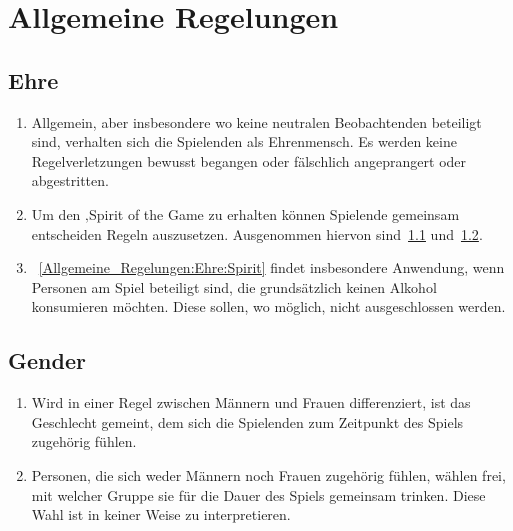 \chapter{Allgemeine Regelungen}\label{Allgemeine_Regelungen}

\section{Ehre}\label{Allgemeine_Regelungen:Ehre}
\begin{enumerate}[label={(\arabic*)}]
	\item Allgemein, aber insbesondere wo keine neutralen Beobachtenden beteiligt sind, verhalten sich die Spielenden als Ehrenmensch.
	Es werden keine Regelverletzungen bewusst begangen oder fälschlich angeprangert oder abgestritten.
	
	\item\label{Allgemeine_Regelungen:Ehre:Spirit}
	Um den \glqq{}‚Spirit of the Game\grqq{} zu erhalten können Spielende gemeinsam entscheiden Regeln auszusetzen.
	Ausgenommen hiervon sind~\ref{Allgemeine_Regelungen:Ehre} und~\ref{Allgemeine_Regelungen:Gender}.
	
	\item
~\ref{Allgemeine_Regelungen:Ehre:Spirit} findet insbesondere Anwendung, wenn Personen am Spiel beteiligt sind, die grundsätzlich keinen Alkohol konsumieren möchten.
	Diese sollen, wo möglich, nicht ausgeschlossen werden.
\end{enumerate}

\section{Gender}\label{Allgemeine_Regelungen:Gender}
\begin{enumerate}[label={(\arabic*)}]	
	\item
	Wird in einer Regel zwischen Männern und Frauen differenziert, ist das Geschlecht gemeint, dem sich die Spielenden zum Zeitpunkt des Spiels zugehörig fühlen.
	
	\item
	Personen, die sich weder Männern noch Frauen zugehörig fühlen, wählen frei, mit welcher Gruppe sie für die Dauer des Spiels gemeinsam trinken.
	Diese Wahl ist in keiner Weise zu interpretieren.
\end{enumerate}
	
